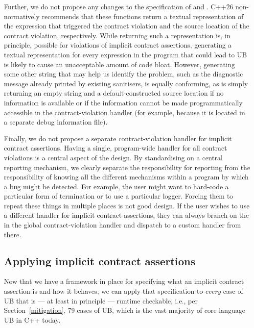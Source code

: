 Further, we do not propose any changes to the specification of  and . C++26 non-normatively recommends that these functions return a textual representation of the expression that triggered the contract violation and the source location of the contract violation, respectively. While returning such a representation is, in principle, possible for violations of implicit contract assertions, generating a textual representation for every expression in the program that could lead to UB is likely to cause an unacceptable amount of code bloat. However, generating some other string that may help us identify the problem, such as the diagnostic message already printed by existing sanitisers, is equally conforming, as is simply returning an empty string and a default-constructed source location if no information is available or if the information cannot be made programmatically accessible in the contract-violation handler (for example,
because it is located in a separate debug information file). 

Finally, we do not propose a separate contract-violation handler for implicit contract assertions. Having a single, program-wide handler for all contract violations is a central aspect of the \cite{P2900R14} design. By standardising on a central reporting mechanism, we clearly separate the responsibility for reporting from the responsibility of knowing all the different mechanisms within a program by which a bug might be detected. For example, the user might want to hard-code a particular form of termination or to use a particular logger. Forcing them to repeat these things in multiple places is not good design. If the user wishes to use a different handler for implicit contract assertions, they can always branch on the  in the global contract-violation handler and dispatch to a custom handler from there.

\subsection{Applying implicit contract assertions}
\label{applyicas}

Now that we have a framework in place for specifying what an implicit contract assertion is and how it behaves, we can apply that specification to \emph{every} case of UB  that is --- at least in principle --- runtime checkable, i.e., per Section~\ref{mitigation}, 79 cases of UB, which is the vast majority of core language UB in C++ today.

